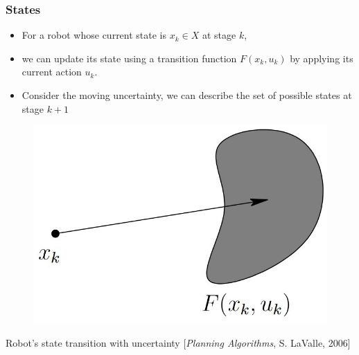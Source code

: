 \documentclass[compress]{beamer}
\begin{document}
\begin{frame}\frametitle{States}
\begin{itemize}
\item[] For a robot whose current state is $x_k \in X$ at stage $k$,

\item[] we can update its state using a transition function $F(x_k, u_k)$ by applying its current action $u_k$.

\item[] Consider the moving uncertainty, we can describe the set of possible states at stage $k+1$
\end{itemize}
\begin{description}
\item
    \begin{figure}
    \includegraphics[scale=0.27]{istate.jpg}
    \end{figure}
\item Robot's state transition with uncertainty [\emph{Planning Algorithms}, S. LaValle, 2006]
\end{description}

\transboxin
\end{frame}
\end{document}
